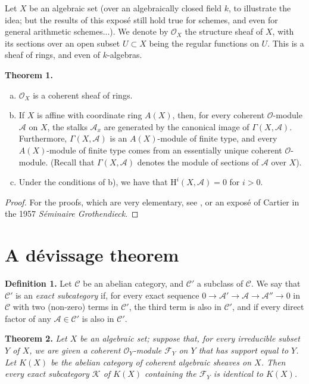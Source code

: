 \documentclass{article}
\newenvironment{itenv}[1]
  {\smallskip\noindent\textbf{#1.}\itshape}
  {\smallskip}
\newenvironment{rmenv}[1]
  {\smallskip\noindent\textbf{#1.}\rmfamily}
  {\smallskip}
\newcommand{\scr}[1]{{\mathscr{#1}}}
\renewcommand{\cal}[1]{{\mathcal{#1}}}
\newcommand{\HH}{\mathrm{H}}
\newcommand{\oldpage}[1]{\marginpar{\footnotesize$\Big\vert$ \textit{p.~#1}}}
\begin{document}
Let $X$ be an algebraic set (over an algebraically closed field $k$, to illustrate the idea; but the results of this expos\'{e} still hold true for schemes, and even for general arithmetic schemes...).
We denote by $\scr{O}_X$ the structure sheaf of $X$, with its sections over an open subset $U\subset X$ being the regular functions on $U$.
This is a sheaf of rings, and even of $k$-algebras.

\begin{itenv}{Theorem 1}
\label{theorem1}
\begin{enumerate}[(a)]
  \item $\scr{O}_X$ is a coherent sheaf of rings.
  \item If $X$ is affine with coordinate ring $A(X)$, then, for every coherent $\scr{O}$-module $\scr{A}$ on $X$, the stalks $\scr{A}_x$ are generated by the canonical image of $\Gamma(X,\scr{A})$.
    Furthermore, $\Gamma(X,\scr{A})$ is an $A(X)$-module of finite type, and every $A(X)$-module of finite type comes from an essentially unique coherent $\scr{O}$-module.
    (Recall that $\Gamma(X,\scr{A})$ denotes the module of sections of $\scr{A}$ over $X$).
  \item Under the conditions of b), we have that $\HH^i(X,\scr{A})=0$ for $i>0$.
\oldpage{2-02}
\end{enumerate}
\end{itenv}

\begin{proof}
  For the proofs, which are very elementary, see \cite[chapitre~2, paragraphes~2,3,4]{1}, or an expos\'{e} of Cartier in the 1957 \emph{S\'{e}minaire Grothendieck}.
\end{proof}


\section{A d\'{e}vissage theorem}
\label{section2}

\begin{rmenv}{Definition 1}
\label{definition1}
  Let $\cal{C}$ be an abelian category, and $\cal{C}'$ a subclass of $\cal{C}$.
  We say that $\cal{C}'$ is an \emph{exact subcategory} if, for every exact sequence $0\to\scr{A}'\to\scr{A}\to\scr{A}''\to0$ in $\cal{C}$ with two (non-zero) terms in $\cal{C}'$, the third term is also in $\cal{C}'$, and if every direct factor of any $\scr{A}\in\cal{C}'$ is also in $\cal{C}'$.
\end{rmenv}

\begin{itenv}{Theorem 2}
\label{theorem2}
  Let $X$ be an algebraic set;
  suppose that, for every irreducible subset $Y$ of $X$, we are given a coherent $\scr{O}_Y$-module $\scr{F}_Y$ on $Y$ that has support equal to $Y$.
  Let $K(X)$ be the abelian category of coherent algebraic sheaves on $X$.
  Then every \emph{exact} subcategory $\cal{K}$ of $K(X)$ containing the $\scr{F}_Y$ is identical to $K(X)$.
\end{itenv}
\end{document}
